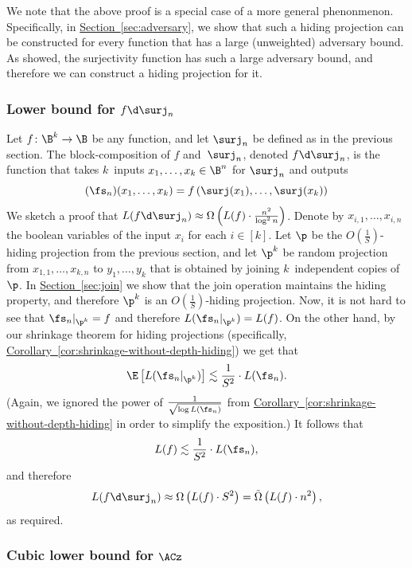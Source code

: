 \documentclass[11pt]{article}
\numberwithin{equation}{section}
\theoremstyle{definition}
\theoremstyle{plain}
\newcommand{\expref}[2]{\hyperref[#2]{#1~\ref{#2}}}
\theoremstyle{definition}\newtheorem{notation}[theorem]{Notation}\theoremstyle{plain}
\begin{document}
We note that the above proof is a special case of a more general phenonmenon. Specifically, in \expref{Section}{sec:adversary},
we show that such a hiding projection can be constructed for every function that has a large (unweighted) adversary bound. As \cite{BM12} showed, the surjectivity function has such a large adversary bound, and therefore we can construct a hiding projection for it.

\subsubsection{Lower bound for \texorpdfstring{$f\protect\d\protect\surj_{n}$}{f o surj\_n}}

Let $f\colon\B^{k}\to\B$ be any function, and let $\surj_{n}$ be defined
as in the previous section. The block-composition of $f$ and~$\surj_{n}$,
denoted $f\d\surj_{n}$, is the function that takes $k$~inputs $x_{1},\ldots,x_{k}\in\B^{n}$
for $\surj_{n}$ and outputs
\[
(\fs_{n})(x_{1},\ldots,x_{k})=f\left(\surj(x_{1}),\ldots,\surj(x_{k})\right)
\]
We sketch a proof that $L(f\d\surj_{n})\approx\Omega\left(L(f)\cdot\frac{n^{2}}{\log^{2}n}\right)$.
Denote by $x_{i,1},\ldots,x_{i,n}$ the boolean variables of the input
$x_{i}$ for each $i\in\left[k\right]$. Let $\p$ be the $O(\frac{1}{S})$-hiding
projection from the previous section, and let $\p^{k}$ be random
projection from $x_{1,1},\ldots,x_{k,n}$ to $y_{1},\ldots,y_{k}$
that is obtained by joining $k$~independent copies of~$\p$. In
\expref{Section}{sec:join} we show that the join operation maintains the hiding
property, and therefore $\p^{k}$ is an $O(\frac{1}{S})$-hiding projection.
Now, it is not hard to see that $\fs_{n}|_{\p^{k}}=f$ and therefore
$L(\fs_{n}|_{\p^{k}})=L(f)$. On the other hand, by our shrinkage
theorem for hiding projections (specifically, 
\expref{Corollary}{cor:shrinkage-without-depth-hiding})
we get that
\[
\E\left[L(\fs_{n}|_{\p^{k}})\right]\lesssim\frac{1}{S^{2}}\cdot L(\fs_{n}).
\]
(Again, we ignored the power of $\frac{1}{\sqrt{\log L(\fs_{n})}}$
from \expref{Corollary}{cor:shrinkage-without-depth-hiding} in order to simplify the
exposition.) It follows that
\[
L(f)\lesssim\frac{1}{S^{2}}\cdot L(\fs_{n}),
\]
and therefore 
\[
L(f\d\surj_{n})\approx\Omega\left(L(f)\cdot S^{2}\right)=\tilde{\Omega}\left(L(f)\cdot n^{2}\right),
\]
as required.

\subsubsection{Cubic lower bound for \texorpdfstring{$\protect\ACz$}{AC0}}
\end{document}
